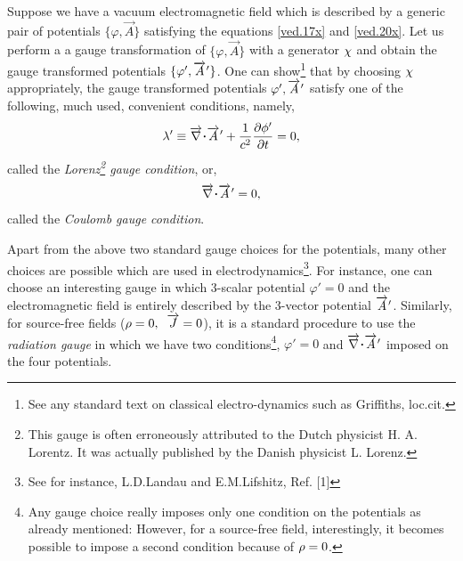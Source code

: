 Suppose we have a vacuum electromagnetic field  which is 
described by a generic pair of potentials $\{\varphi, 
\vec{A}\}$ satisfying the equations \eqref{ved.17x} and 
\eqref{ved.20x}. Let us perform a a gauge 
transformation  of $\{\varphi, \vec{A}\}$ with a 
generator ${\chi}$ and obtain the gauge transformed 
potentials $\{\varphi', {\overrightarrow{A}\hspace*{.3pt}'}\}$. One can 
show\footnote{See any standard text on classical 
electro-dynamics such as Griffiths, loc.cit.} that 
by choosing  ${\chi}$ appropriately, the gauge 
transformed potentials ${\varphi', {\overrightarrow{A}\hspace*{.3pt}'}}$ satisfy 
one of the following, much used, convenient conditions, 
namely,
\begin{align}\label{ved.24x}
 \lambda' \equiv \vnab \dotp \pvec{A}+\frac{1}{c^2}
\frac{\dow\phi'}{\dow t}=0,
\end{align}
called the \textsl{Lorenz\footnote{This gauge is often 
erroneously attributed to the Dutch physicist H. A. Lorentz. 
It was actually published by the Danish physicist L. 
Lorenz.} gauge condition}, or,
\begin{align}\label{ved.25x}
\vnab \dotp \pvec{A}=0,
\end{align}
called the \textsl{Coulomb gauge condition}.

Apart from the above two standard gauge choices for the 
potentials, many other choices are possible which are used 
in electrodynamics\footnote{See for instance, L.D.Landau 
and E.M.Lifshitz, Ref. [1]}. For instance, one can choose 
an  interesting  gauge in which 3-scalar potential 
$\varphi'=0$ and the electromagnetic field is entirely 
described by the 3-vector potential ${\overrightarrow{A}\hspace*{.3pt}'}$.  Similarly, 
for source-free fields (${\rho}=0,\;\;\overrightarrow{J}=0$), it is a 
standard procedure to use  the \textsl{radiation gauge} in 
which we have two conditions\footnote{Any gauge choice 
really imposes only one condition on the potentials as 
already mentioned: However, for a source-free field, 
interestingly, it becomes possible to impose a second 
condition because of ${\rho}=0$.},  $\varphi' =0$ and $\vnab 
\dotp \pvec{A}$ imposed on the four potentials.

